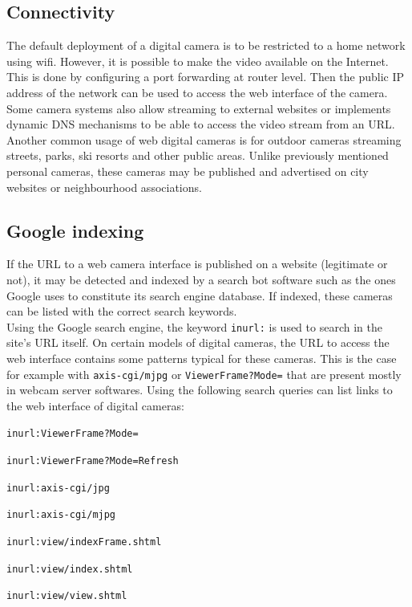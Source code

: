 \subsection{Connectivity}
\label{sec:cam-connect}

The default deployment of a digital camera is to be restricted to a home network using wifi.
However, it is possible to make the video available on the Internet.
This is done by configuring a port forwarding at router level.
Then the public IP address of the network can be used to access the web interface of the camera.
Some camera systems also allow streaming to external websites or implements dynamic DNS mechanisms to be able to access the video stream from an URL.\\

Another common usage of web digital cameras is for outdoor cameras streaming streets, parks, ski resorts and other public areas.
Unlike previously mentioned personal cameras, these cameras may be published and advertised on city websites or neighbourhood associations.

\subsection{Google indexing}

If the URL to a web camera interface is published on a website (legitimate or not), it may be detected and indexed by a search bot software such as the ones Google uses to constitute its search engine database.
If indexed, these cameras can be listed with the correct search keywords.\\

Using the Google search engine, the keyword \texttt{inurl:} is used to search in the site's URL itself.
On certain models of digital cameras, the URL to access the web interface contains some patterns typical for these cameras.
This is the case for example with \texttt{axis-cgi/mjpg} or \texttt{ViewerFrame?Mode=} that are present mostly in webcam server softwares.
Using the following search queries can list links to the web interface of digital cameras:

\begin{itemizealt}
\item \texttt{inurl:ViewerFrame?Mode=}
\item \texttt{inurl:ViewerFrame?Mode=Refresh}
\item \texttt{inurl:axis-cgi/jpg}
\item \texttt{inurl:axis-cgi/mjpg}
\item \texttt{inurl:view/indexFrame.shtml}
\item \texttt{inurl:view/index.shtml}
\item \texttt{inurl:view/view.shtml}
\end{itemizealt}

